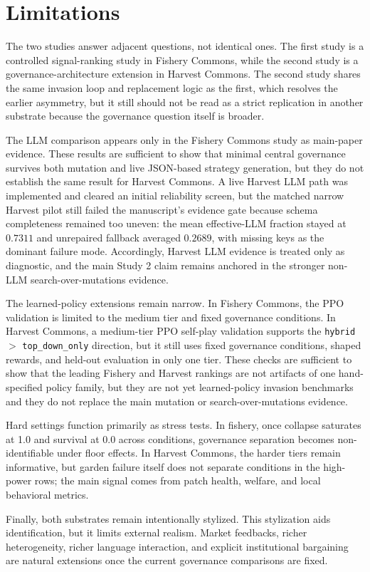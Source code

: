 \section{Limitations}

The two studies answer adjacent questions, not identical ones. The first study is a controlled signal-ranking study in Fishery Commons, while the second study is a governance-architecture extension in Harvest Commons. The second study shares the same invasion loop and replacement logic as the first, which resolves the earlier asymmetry, but it still should not be read as a strict replication in another substrate because the governance question itself is broader.

The LLM comparison appears only in the Fishery Commons study as main-paper evidence. These results are sufficient to show that minimal central governance survives both mutation and live JSON-based strategy generation, but they do not establish the same result for Harvest Commons. A live Harvest LLM path was implemented and cleared an initial reliability screen, but the matched narrow Harvest pilot still failed the manuscript's evidence gate because schema completeness remained too uneven: the mean effective-LLM fraction stayed at \(0.7311\) and unrepaired fallback averaged \(0.2689\), with missing keys as the dominant failure mode. Accordingly, Harvest LLM evidence is treated only as diagnostic, and the main Study 2 claim remains anchored in the stronger non-LLM search-over-mutations evidence.

The learned-policy extensions remain narrow. In Fishery Commons, the PPO validation is limited to the medium tier and fixed governance conditions. In Harvest Commons, a medium-tier PPO self-play validation supports the \texttt{hybrid} \(>\) \texttt{top\_down\_only} direction, but it still uses fixed governance conditions, shaped rewards, and held-out evaluation in only one tier. These checks are sufficient to show that the leading Fishery and Harvest rankings are not artifacts of one hand-specified policy family, but they are not yet learned-policy invasion benchmarks and they do not replace the main mutation or search-over-mutations evidence.

Hard settings function primarily as stress tests. In fishery, once collapse saturates at 1.0 and survival at 0.0 across conditions, governance separation becomes non-identifiable under floor effects. In Harvest Commons, the harder tiers remain informative, but garden failure itself does not separate conditions in the high-power rows; the main signal comes from patch health, welfare, and local behavioral metrics.

Finally, both substrates remain intentionally stylized. This stylization aids identification, but it limits external realism. Market feedbacks, richer heterogeneity, richer language interaction, and explicit institutional bargaining are natural extensions once the current governance comparisons are fixed.
